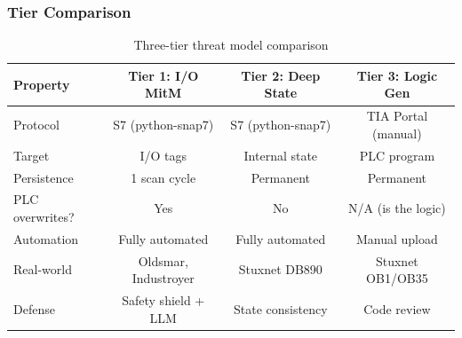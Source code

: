 \subsubsection{Tier Comparison}

\begin{table}[h]
\centering
\caption{Three-tier threat model comparison}
\label{tab:threat-tiers}
\small
\begin{tabular}{@{}lccc@{}}
\toprule
\textbf{Property} & \textbf{Tier 1: I/O MitM} & \textbf{Tier 2: Deep State} & \textbf{Tier 3: Logic Gen} \\
\midrule
Protocol & S7 (python-snap7) & S7 (python-snap7) & TIA Portal (manual) \\
Target & I/O tags & Internal state & PLC program \\
Persistence & 1 scan cycle & Permanent & Permanent \\
PLC overwrites? & Yes & No & N/A (is the logic) \\
Automation & Fully automated & Fully automated & Manual upload \\
Real-world & Oldsmar, Industroyer & Stuxnet DB890 & Stuxnet OB1/OB35 \\
Defense & Safety shield + LLM & State consistency & Code review \\
\bottomrule
\end{tabular}
\end{table}